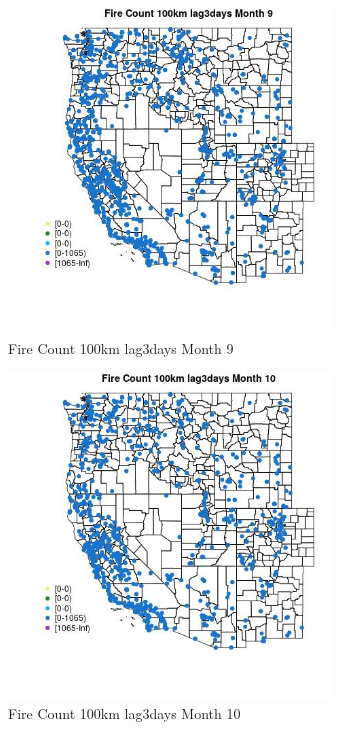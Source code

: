 \begin{figure} 
\centering  
\includegraphics[width=0.77\textwidth]{Code_Outputs/Report_ML_input_PM25_Step4_part_f_de_duplicated_aves_prioritize_24hr_obswNAs_MapObsMo9Fire_Count_100km_lag3days.jpg} 
\caption{\label{fig:Report_ML_input_PM25_Step4_part_f_de_duplicated_aves_prioritize_24hr_obswNAsMapObsMo9Fire_Count_100km_lag3days}Fire Count 100km lag3days Month 9} 
\end{figure} 
 

\clearpage 

\begin{figure} 
\centering  
\includegraphics[width=0.77\textwidth]{Code_Outputs/Report_ML_input_PM25_Step4_part_f_de_duplicated_aves_prioritize_24hr_obswNAs_MapObsMo10Fire_Count_100km_lag3days.jpg} 
\caption{\label{fig:Report_ML_input_PM25_Step4_part_f_de_duplicated_aves_prioritize_24hr_obswNAsMapObsMo10Fire_Count_100km_lag3days}Fire Count 100km lag3days Month 10} 
\end{figure} 
 

